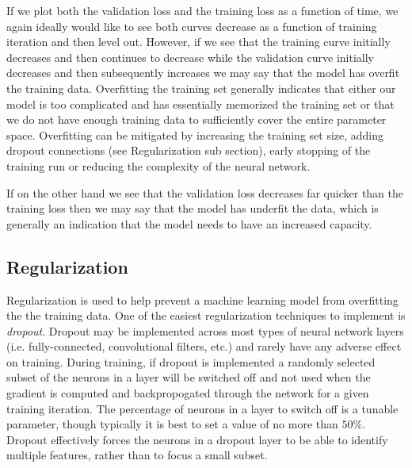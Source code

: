 If we plot both the validation loss and the training loss as a function of time, we again ideally would like to see both curves decrease as a function of training iteration and then level out. However, if we see that the training curve initially decreases and then continues to decrease while the validation curve initially decreases and then subsequently increases we may say that the model has overfit the training data. Overfitting the training set generally indicates that either our model is too complicated and has essentially memorized the training set or that we do not have enough training data to sufficiently cover the entire parameter space. Overfitting can be mitigated by increasing the training set size, adding dropout connections (see Regularization sub section), early stopping of the training run or reducing the complexity of the neural network.

If on the other hand we see that the validation loss decreases far quicker than the training loss then we may say that the model has underfit the data, which is generally an indication that the model needs to have an increased capacity.

%
%
\subsection{Regularization}\label{sec:ml_regularization}

%
%
Regularization is used to help prevent a machine learning model from overfitting the the training data. One of the easiest regularization techniques to implement is \textit{dropout}. Dropout may be implemented across most types of neural network layers (i.e. fully-connected, convolutional filters, etc.) and rarely have any adverse effect on training. During training, if dropout is implemented a randomly selected 
subset of the neurons in a layer will be switched off and not used when the gradient is computed and backpropogated through the network for a given training iteration. The percentage of neurons in a layer to switch off is a tunable parameter, though typically it is best to set a value of no more than $50\%$. Dropout effectively forces the neurons in a dropout layer to be able to identify multiple features, rather than to focus a small subset.


